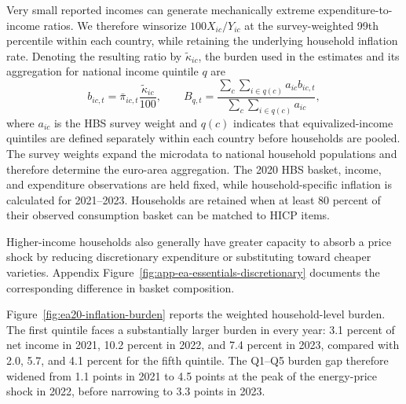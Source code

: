 \documentclass[11pt]{article}
\begin{document}
Very small reported incomes can generate mechanically extreme expenditure-to-income ratios. We
therefore winsorize $100X_{ic}/Y_{ic}$ at the survey-weighted 99th percentile within each country,
while retaining the underlying household inflation rate. Denoting the resulting ratio by
$\widetilde{\kappa}_{ic}$, the burden used in the estimates and its aggregation for national income
quintile $q$ are
\begin{equation}
b_{ic,t}=\bar{\pi}_{ic,t}\frac{\widetilde{\kappa}_{ic}}{100},
\qquad
B_{q,t}=\frac{\sum_{c}\sum_{i\in q(c)}a_{ic}b_{ic,t}}
{\sum_{c}\sum_{i\in q(c)}a_{ic}},
\label{eq:aggregate-micro-inflation-burden}
\end{equation}
where $a_{ic}$ is the HBS survey weight and $q(c)$ indicates that equivalized-income quintiles are
defined separately within each country before households are pooled. The survey weights expand the
microdata to national household populations and therefore determine the euro-area aggregation.
The 2020 HBS basket, income, and expenditure observations are held fixed, while household-specific
inflation is calculated for 2021--2023. Households are retained when at least 80 percent of their
observed consumption basket can be matched to HICP items.

Higher-income households also generally have greater capacity to absorb a price
shock by reducing discretionary expenditure or substituting toward cheaper varieties. Appendix
Figure~\ref{fig:app-ea-essentials-discretionary} documents the corresponding difference in basket
composition.

Figure~\ref{fig:ea20-inflation-burden} reports the weighted household-level burden. The first
quintile faces a substantially larger burden in every year: 3.1 percent of net income in 2021,
10.2 percent in 2022, and 7.4 percent in 2023, compared with 2.0, 5.7, and 4.1 percent for the fifth
quintile. The Q1--Q5 burden gap therefore widened from 1.1 points in 2021 to 4.5 points at the peak
of the energy-price shock in 2022, before narrowing to 3.3 points in 2023.
\end{document}
